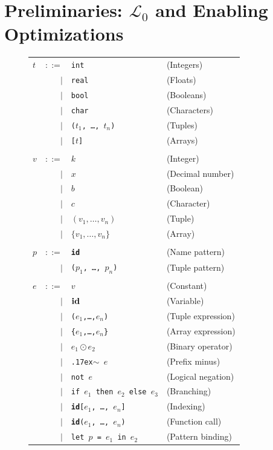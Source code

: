 \documentclass{sigplanconf}  %
\renewcommand\tilde[0]{{\raise.17ex\hbox{$\scriptstyle\sim$}}}
\begin{document}
\section{Preliminaries: $\mathcal{L}_0$ and Enabling Optimizations}
\label{sec:Prelim}


\begin{figure}[bt]
\begin{tabular}{lrll}
$t$ & $::=$ & {\tt int} & (Integers) \\
& $|$ & {\tt real} & (Floats) \\
& $|$ & {\tt bool} & (Booleans) \\
& $|$ & {\tt char} & (Characters) \\
& $|$ & {\tt ($t_{1}$, \ldots, $t_{n}$)} & (Tuples) \\
& $|$ & {\tt [$t$]} & (Arrays) \\
\\
$v$ & $::=$ & $k$ & (Integer)\\
& $|$ & $x$ & (Decimal number) \\
& $|$ & $b$ & (Boolean)\\
& $|$ & $c$ & (Character)\\
& $|$ & $(v_{1},\ldots,v_{n})$ & (Tuple) \\
& $|$ & $\{v_{1},\ldots,v_{n}\}$ & (Array) \\
\\
$p$ & $::=$ & {\tt {\bf id}} & (Name pattern)\\
& $|$ & {\tt ($p_{1}$, \ldots, $p_{n}$)} & (Tuple pattern) \\
\\
$e$ & $::=$ & $v$ & (Constant)\\
& $|$ & ${\bf id}$ & (Variable)\\
& $|$ & {\tt ($e_{1}$,\ldots,$e_{n}$)} & (Tuple expression) \\
& $|$ & {\tt \{$e_{1}$,\ldots,$e_{n}$\}} & (Array expression) \\
& $|$ & $e_{1} \odot{} e_{2}$ & (Binary operator) \\
& $|$ & {\tt \tilde{} $e$} & (Prefix minus) \\
& $|$ & {\tt not $e$} & (Logical negation) \\
& $|$ & {\tt if $e_{1}$ then $e_{2}$ else $e_{3}$} & (Branching) \\
& $|$ & {\tt {\bf id}[$e_{1}$, \ldots, $e_{n}$]} & (Indexing) \\
& $|$ & {\tt {\bf id}($e_{1}$, \ldots, $e_{n}$)} & (Function call) \\
& $|$ & {\tt let $p$ = $e_{1}$ in $e_{2}$} & (Pattern binding) \\

\end{tabular}
\end{figure}
\end{document}
